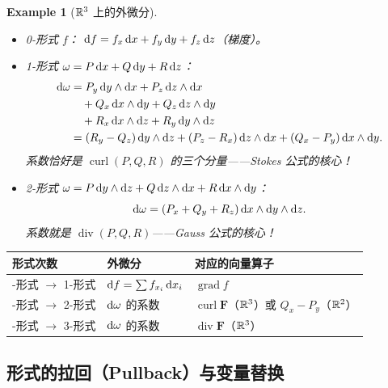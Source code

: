 \documentclass{article}
\newtheorem{example}[theorem]{Example}
\DeclareMathOperator{\curl}{curl}
\DeclareMathOperator{\divergence}{div}
\DeclareMathOperator{\grad}{grad}
\begin{document}
\begin{example}[$\mathbb{R}^3$ 上的外微分]
  \begin{itemize}
    \item 0-形式 $f$：
      $\mathrm{d} f = f_x\,\mathrm{d} x + f_y\,\mathrm{d} y + f_z\,\mathrm{d} z$（梯度）。
    \item 1-形式 $\omega = P\,\mathrm{d} x + Q\,\mathrm{d} y + R\,\mathrm{d} z$：
      \begin{align*}
        \mathrm{d}\omega &= P_y\,\mathrm{d} y\wedge\mathrm{d} x + P_z\,\mathrm{d} z\wedge\mathrm{d} x \\
        &\quad + Q_x\,\mathrm{d} x\wedge\mathrm{d} y + Q_z\,\mathrm{d} z\wedge\mathrm{d} y \\
        &\quad + R_x\,\mathrm{d} x\wedge\mathrm{d} z + R_y\,\mathrm{d} y\wedge\mathrm{d} z \\
        &= (R_y - Q_z)\,\mathrm{d} y\wedge\mathrm{d} z
        + (P_z - R_x)\,\mathrm{d} z\wedge\mathrm{d} x
        + (Q_x - P_y)\,\mathrm{d} x\wedge\mathrm{d} y.
      \end{align*}
      系数恰好是 $\curl(P,Q,R)$ 的三个分量——Stokes 公式的核心！
    \item 2-形式 $\omega = P\,\mathrm{d} y\wedge\mathrm{d} z + Q\,\mathrm{d} z\wedge\mathrm{d}
      x + R\,\mathrm{d} x\wedge\mathrm{d} y$：
      \[
        \mathrm{d}\omega = (P_x + Q_y + R_z)\,\mathrm{d} x\wedge\mathrm{d} y\wedge\mathrm{d} z.
      \]
      系数就是 $\divergence(P,Q,R)$——Gauss 公式的核心！
  \end{itemize}
\end{example}

\begin{center}
  \renewcommand{\arraystretch}{1.5}
  \begin{tabular}{>{\raggedright\arraybackslash}p{2.5cm}
      >{\raggedright\arraybackslash}p{4cm}
    >{\raggedright\arraybackslash}p{5cm}}
    \toprule
    \textbf{形式次数} & \textbf{外微分} & \textbf{对应的向量算子} \\
    \midrule
    0-形式 $\to$ 1-形式 & $\mathrm{d} f = \sum f_{x_i}\,\mathrm{d} x_i$ & $\grad f$ \\
    1-形式 $\to$ 2-形式 & $\mathrm{d}\omega$ 的系数 & $\curl\mathbf{F}$（$\mathbb{R}^3$）或
    $Q_x-P_y$（$\mathbb{R}^2$） \\
    2-形式 $\to$ 3-形式 & $\mathrm{d}\omega$ 的系数 & $\divergence\mathbf{F}$（$\mathbb{R}^3$） \\
    \bottomrule
  \end{tabular}
\end{center}

\subsection{形式的拉回（Pullback）与变量替换}
\end{document}
